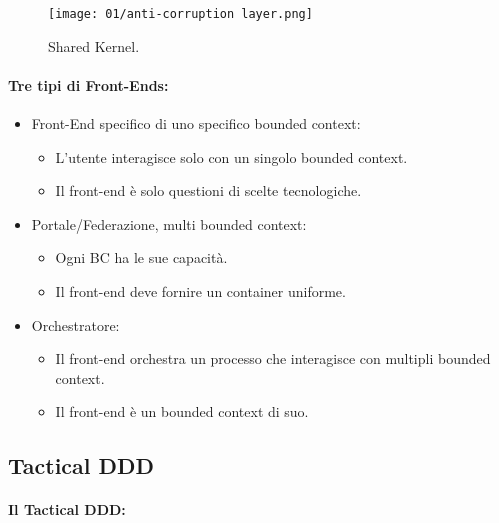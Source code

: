 \begin{figure}[h]
	\begin{center}
		\texttt{[image: 01/anti-corruption layer.png]}
	\end{center}
	\caption{Shared Kernel.}
\end{figure}

\paragraph{Tre tipi di Front-Ends:}

\begin{itemize}
	\item Front-End specifico di uno specifico bounded context:
	      \begin{itemize}
		      \item L'utente interagisce solo con un singolo bounded context.
		      \item Il front-end è solo questioni di scelte tecnologiche.
	      \end{itemize}
	\item Portale/Federazione, multi bounded context:
	      \begin{itemize}
		      \item Ogni BC ha le sue capacità.
		      \item Il front-end deve fornire un container uniforme.
	      \end{itemize}
	\item Orchestratore:
	      \begin{itemize}
		      \item Il front-end orchestra un processo che interagisce con multipli bounded context.
		      \item Il front-end è un bounded context di suo.
	      \end{itemize}
\end{itemize}


\subsection{Tactical DDD}


\paragraph{Il Tactical DDD:}

